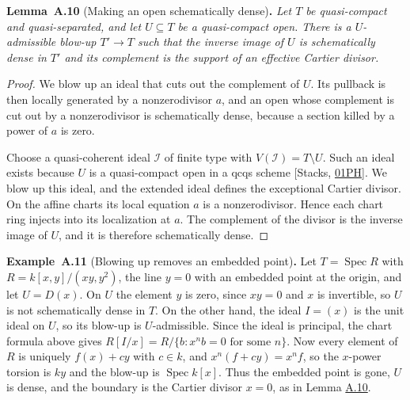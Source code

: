 \documentclass[11pt]{article}
\newenvironment{bpstatement}[2]{\par\addvspace{0.6\baselineskip}\noindent\textbf{#1}#2\textbf{.}\enspace\ignorespaces}
  {\par\addvspace{0.4\baselineskip}}
\newenvironment{bpstatementit}[2]{\begin{bpstatement}{#1}{#2}\itshape\ignorespaces}{\end{bpstatement}}
\begin{document}
\label{bp29}%
\begin{bpstatementit}{Lemma~A.10}{ (Making an open schematically dense)}
Let \(T\) be quasi-compact and quasi-separated, and let \(U\subseteq T\) be a quasi-compact open. There is a \(U\)-admissible blow-up \(T'\to T\) such that the inverse image of \(U\) is schematically dense in \(T'\) and its complement is the support of an effective Cartier divisor.
\end{bpstatementit}

\begin{proof}[{Proof}]\label{bp30}%
We blow up an ideal that cuts out the complement of \(U\). Its pullback is then locally generated by a nonzerodivisor \(a\), and an open whose complement is cut out by a nonzerodivisor is schematically dense, because a section killed by a power of \(a\) is zero.

Choose a quasi-coherent ideal \(\mathcal I\) of finite type with \(V(\mathcal I)=T\setminus U\). Such an ideal exists because \(U\) is a quasi-compact open in a qcqs scheme [Stacks, \href{https://stacks.math.columbia.edu/tag/01PH}{01PH}]. We blow up this ideal, and the extended ideal defines the exceptional Cartier divisor. On the affine charts its local equation \(a\) is a nonzerodivisor. Hence each chart ring injects into its localization at \(a\). The complement of the divisor is the inverse image of \(U\), and it is therefore schematically dense.
\end{proof}

\label{bp31}%
\begin{bpstatement}{Example~A.11}{ (Blowing up removes an embedded point)}
Let \(T=\operatorname{Spec}R\) with \(R=k[x,y]/(xy,y^2)\), the line \(y=0\) with an embedded point at the origin, and let \(U=D(x)\). On \(U\) the element \(y\) is zero, since \(xy=0\) and \(x\) is invertible, so \(U\) is not schematically dense in \(T\). On the other hand, the ideal \(I=(x)\) is the unit ideal on \(U\), so its blow-up is \(U\)-admissible. Since the ideal is principal, the chart formula above gives \(R[I/x]=R/\{b:x^nb=0\text{ for some }n\}\). Now every element of \(R\) is uniquely \(f(x)+cy\) with \(c\in k\), and \(x^n(f+cy)=x^nf\), so the \(x\)-power torsion is \(ky\) and the blow-up is \(\operatorname{Spec}k[x]\). Thus the embedded point is gone, \(U\) is dense, and the boundary is the Cartier divisor \(x=0\), as in Lemma \hyperref[bp29]{A.10}.
\end{bpstatement}
\end{document}
